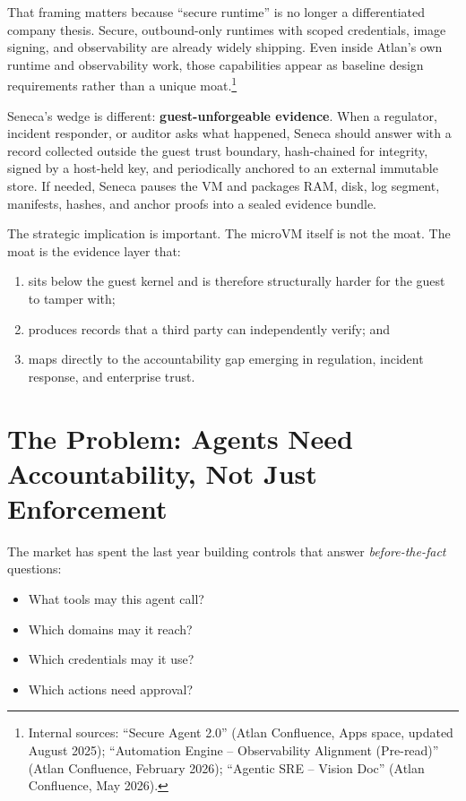 \documentclass[11pt]{article}
\begin{document}
That framing matters because ``secure runtime'' is no longer a differentiated company thesis. Secure, outbound-only runtimes with scoped credentials, image signing, and observability are already widely shipping. Even inside Atlan's own runtime and observability work, those capabilities appear as baseline design requirements rather than a unique moat.\footnote{Internal sources: ``Secure Agent 2.0'' (Atlan Confluence, Apps space, updated August 2025); ``Automation Engine -- Observability Alignment (Pre-read)'' (Atlan Confluence, February 2026); ``Agentic SRE -- Vision Doc'' (Atlan Confluence, May 2026).}

Seneca's wedge is different: \textbf{guest-unforgeable evidence}. When a regulator, incident responder, or auditor asks what happened, Seneca should answer with a record collected outside the guest trust boundary, hash-chained for integrity, signed by a host-held key, and periodically anchored to an external immutable store. If needed, Seneca pauses the VM and packages RAM, disk, log segment, manifests, hashes, and anchor proofs into a sealed evidence bundle.

The strategic implication is important. The microVM itself is not the moat. The moat is the evidence layer that:
\begin{enumerate}[leftmargin=1.5em]
    \item sits below the guest kernel and is therefore structurally harder for the guest to tamper with;
    \item produces records that a third party can independently verify; and
    \item maps directly to the accountability gap emerging in regulation, incident response, and enterprise trust.
\end{enumerate}

\section{The Problem: Agents Need Accountability, Not Just Enforcement}

The market has spent the last year building controls that answer \emph{before-the-fact} questions:
\begin{itemize}[leftmargin=1.5em]
    \item What tools may this agent call?
    \item Which domains may it reach?
    \item Which credentials may it use?
    \item Which actions need approval?
\end{itemize}
\end{document}
